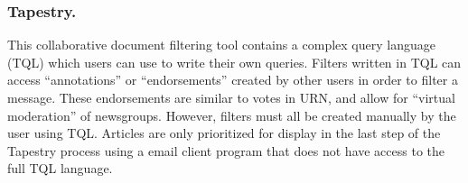 \subsubsection{Tapestry.}

This collaborative document filtering tool \cite{cacm-tapestry-92} contains a
complex query language (TQL) which users can use to write their own queries.
Filters written in TQL can access ``annotations'' or ``endorsements'' created
by other users in order to filter a message. These endorsements are similar to
votes in URN, and allow for ``virtual moderation'' of newsgroups. However,
filters must all be created manually by the user using TQL. Articles are only
prioritized for display in the last step of the Tapestry process using a email
client program that does not have access to the full TQL language.
